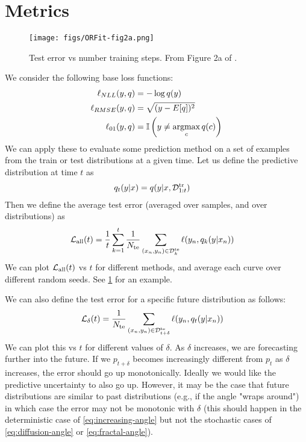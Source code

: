 
\section{Metrics}

\begin{figure}[h]
    \centering
\texttt{[image: figs/ORFit-fig2a.png]} 
    \caption{Test error vs number training steps.
    From Figure 2a of \citep{ORFit}.
    }
    \label{fig:errorCurve}
\end{figure}

We consider the following  base loss functions:
\begin{align}
\ell_{NLL}(y, q) &= -\log q(y) \\
\ell_{RMSE}(y, q) &= \sqrt{(y - E[q])^2} \\
\ell_{01}(y, q) &= \ind{y \neq \argmax_c q(c)}
\end{align}
We can apply these to evaluate some prediction method on a set of examples from the train or test distributions at a given time.
Let us define the predictive distribution at time $t$ as
\begin{align}
q_t(y|x) &= q(y|x,{\mathcal{D}}_{1:t}^{\mathrm{tr}})
\end{align}
Then we define the average test error (averaged over samples, and over distributions) as 
\begin{align}
\mathcal{L}_{\text{all}}(t)
 &= \frac{1}{t} \sum_{k=1}^t \frac{1}{N_{\text{te}}}
\sum_{(x_n, y_n) \in {\mathcal{D}}_k^{\text{te}}} \ell(y_n, q_k(y\vert x_n))
\end{align}
We can plot $\mathcal{L}_{\text{all}}(t)$ vs $t$ for different methods,
and average each curve over different random seeds.
See \cref{fig:errorCurve} for an example.

We can also define the test error for a specific future distribution as follows:
\begin{align}
\mathcal{L}_{\delta}(t)
 &=   \frac{1}{N_{\text{te}}}
\sum_{(x_n, y_n) \in {\mathcal{D}}_{t+\delta}^{\text{te}}} \ell(y_n, q_t(y\vert x_n))
\end{align}
We can plot this vs $t$ for different values of $\delta$.
As $\delta$ increases, we are forecasting further into the future.
If we $p_{t+\delta}$ becomes increasingly different from $p_t$ as $\delta$ increases, the error should go up monotonically.
Ideally we would like the predictive uncertainty to also go up.
However, it may be the case that future distributions are similar to past distributions (e.g., if the angle "wraps around") in which case the error may not be monotonic with $\delta$ (this should happen in the deterministic case of \eqref{eq:increasing-angle} but not the stochastic cases of \eqref{eq:diffusion-angle} or \eqref{eq:fractal-angle}).

